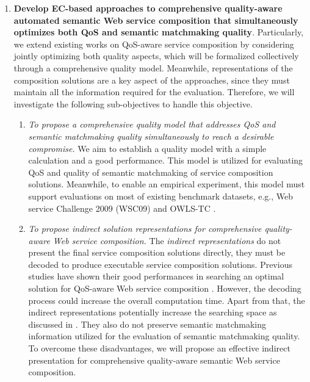 \begin{enumerate}
  \item \label{Obj:1} \textbf{Develop EC-based approaches to comprehensive quality-aware automated semantic Web service composition that simultaneously optimizes both QoS and semantic matchmaking quality}. Particularly, we extend existing works on QoS-aware service composition by considering jointly optimizing both quality aspects, which will be formalized collectively through a comprehensive quality model. Meanwhile, representations of the composition solutions are a key aspect of the approaches, since they must maintain all the information required for the evaluation. Therefore, we will investigate the following sub-objectives to handle this objective.
  \begin{enumerate}
    \item \emph{To propose a comprehensive quality model that addresses QoS and semantic matchmaking quality simultaneously to reach a desirable compromise.} We aim to establish a quality model with a simple calculation and a good performance. This model is utilized for evaluating QoS and quality of semantic matchmaking of service composition solutions. Meanwhile, to enable an empirical experiment, this model must support evaluations on most of existing benchmark datasets, e.g., Web service Challenge 2009 (WSC09)\cite{kona2009wsc} and OWLS-TC \cite{kuster2008opossum}.
    
    \item \emph{To propose indirect solution representations for comprehensive quality-aware Web service composition.} The \emph{indirect representations} do not present the final service composition solutions directly, they must be decoded to produce executable service composition solutions. Previous studies have shown their good performances in searching an optimal solution for QoS-aware Web service composition \cite{da2016memetic,da2016particle}. However, the decoding process could increase the overall computation time. Apart from that, the indirect representations potentially increase the searching space as discussed in \cite{da2016particle}. They also do not preserve semantic matchmaking information utilized for the evaluation of semantic matchmaking quality. To overcome these disadvantages, we will propose an effective indirect presentation for comprehensive quality-aware semantic Web service composition.


\end{enumerate}
\end{enumerate}
